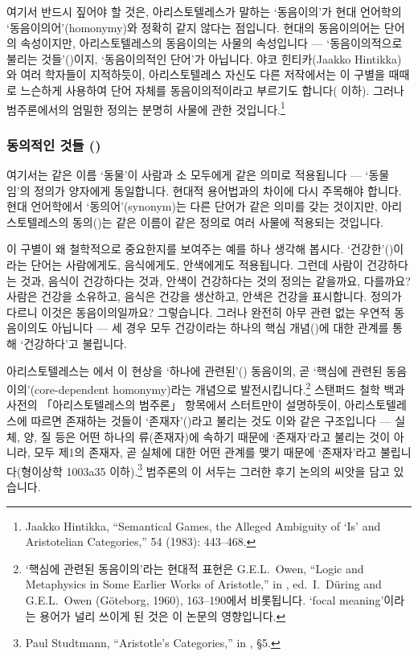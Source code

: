 \documentclass[12pt, a4paper]{article}
\begin{document}
여기서 반드시 짚어야 할 것은, 아리스토텔레스가 말하는 `동음이의'가 현대 언어학의 `동음이의어'(homonymy)와 정확히 같지 않다는 점입니다. 현대의 동음이의어는 단어의 속성이지만, 아리스토텔레스의 동음이의는 사물의 속성입니다 --- `동음이의적으로 불리는 것들'()이지, `동음이의적인 단어'가 아닙니다. 야코 힌티카(Jaakko Hintikka)와 여러 학자들이 지적하듯이, 아리스토텔레스 자신도 다른 저작에서는 이 구별을 때때로 느슨하게 사용하여 단어 자체를 동음이의적이라고 부르기도 합니다( 이하). 그러나 범주론에서의 엄밀한 정의는 분명히 사물에 관한 것입니다.\footnote{Jaakko Hintikka, ``Semantical Games, the Alleged Ambiguity of `Is' and Aristotelian Categories,''  54 (1983): 443--468.}

\subsubsection{동의적인 것들 ()}


여기서는 같은 이름 `동물'이 사람과 소 모두에게 같은 의미로 적용됩니다 --- `동물임'의 정의가 양자에게 동일합니다. 현대적 용어법과의 차이에 다시 주목해야 합니다. 현대 언어학에서 `동의어'(synonym)는 다른 단어가 같은 의미를 갖는 것이지만, 아리스토텔레스의 동의()는 같은 이름이 같은 정의로 여러 사물에 적용되는 것입니다.

이 구별이 왜 철학적으로 중요한지를 보여주는 예를 하나 생각해 봅시다. `건강한'()이라는 단어는 사람에게도, 음식에게도, 안색에게도 적용됩니다. 그런데 사람이 건강하다는 것과, 음식이 건강하다는 것과, 안색이 건강하다는 것의 정의는 같을까요, 다를까요? 사람은 건강을 소유하고, 음식은 건강을 생산하고, 안색은 건강을 표시합니다. 정의가 다르니 이것은 동음이의일까요? 그렇습니다. 그러나 완전히 아무 관련 없는 우연적 동음이의도 아닙니다 --- 세 경우 모두 건강이라는 하나의 핵심 개념()에 대한 관계를 통해 `건강하다'고 불립니다.

아리스토텔레스는 에서 이 현상을 `하나에 관련된'() 동음이의, 곧 `핵심에 관련된 동음이의'(core-dependent homonymy)라는 개념으로 발전시킵니다.\footnote{`핵심에 관련된 동음이의'라는 현대적 표현은 G.E.L.\ Owen, ``Logic and Metaphysics in Some Earlier Works of Aristotle,'' in , ed.\ I.\ Düring and G.E.L.\ Owen (Göteborg, 1960), 163--190에서 비롯됩니다. `focal meaning'이라는 용어가 널리 쓰이게 된 것은 이 논문의 영향입니다.} 스탠퍼드 철학 백과사전의 「아리스토텔레스의 범주론」 항목에서 스터트만이 설명하듯이, 아리스토텔레스에 따르면 존재하는 것들이 `존재자'()라고 불리는 것도 이와 같은 구조입니다 --- 실체, 양, 질 등은 어떤 하나의 류(존재자)에 속하기 때문에 `존재자'라고 불리는 것이 아니라, 모두 제1의 존재자, 곧 실체에 대한 어떤 관계를 맺기 때문에 `존재자'라고 불립니다(형이상학 1003a35 이하).\footnote{Paul Studtmann, ``Aristotle's Categories,'' in , §5.} 범주론의 이 서두는 그러한 후기 논의의 씨앗을 담고 있습니다.
\end{document}
